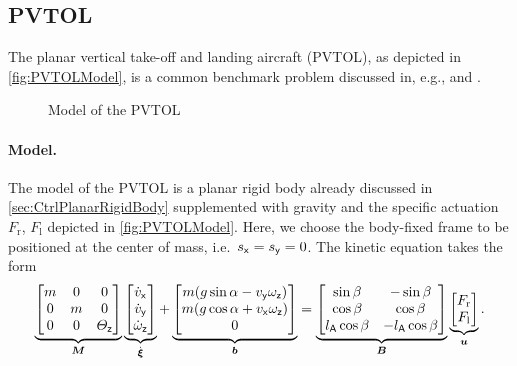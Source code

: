 \subsection{PVTOL}\label{sec:CtrlExamplePVTOL}
The planar vertical take-off and landing aircraft (PVTOL), as depicted in \autoref{fig:PVTOLModel}, is a common benchmark problem discussed in, e.g., \cite{Hauser:PVTOL} and \cite{Fliess:LieBacklund}.
\begin{figure}
 \centering
 
 \caption{Model of the PVTOL}
 \label{fig:PVTOLModel}
\end{figure}

\paragraph{Model.}
The model of the PVTOL is a planar rigid body already discussed in \autoref{sec:CtrlPlanarRigidBody} supplemented with gravity and the specific actuation $F_\text{r}$, $F_\text{l}$ depicted in \autoref{fig:PVTOLModel}.
Here, we choose the body-fixed frame to be positioned at the center of mass, i.e.\ $s_{\mathsf{x}} = s_{\mathsf{y}} = 0$.
The kinetic equation takes the form
\begin{align}
 \underbrace{\begin{bmatrix} m & 0 & 0 \\ 0 & m & 0 \\ 0 & 0 & \varTheta_{\mathsf{z}} \end{bmatrix}}_{\boldsymbol{M}}
 \underbrace{\begin{bmatrix} \dot{v}_{\mathsf{x}} \\ \dot{v}_{\mathsf{y}} \\ \dot{\omega}_{\mathsf{z}} \end{bmatrix}}_{\dot{\boldsymbol{\xi}}}
 +
 \underbrace{\begin{bmatrix} m(g \sin\alpha - v_{\mathsf{y}} \omega_{\mathsf{z}}) \\ m (g \cos\alpha + v_{\mathsf{x}} \omega_{\mathsf{z}}) \\ 0 \end{bmatrix}}_{\boldsymbol{b}}
 =
 \underbrace{\begin{bmatrix} \sin\beta & -\sin\beta \\ \cos\beta & \cos\beta \\ l_{\mathsf{A}} \cos\beta & -l_{\mathsf{A}}\cos\beta \end{bmatrix}}_{\boldsymbol{B}}
 \underbrace{\begin{bmatrix} F_\text{r} \\ F_\text{l} \end{bmatrix}}_{\boldsymbol{u}}
 .
\end{align}
